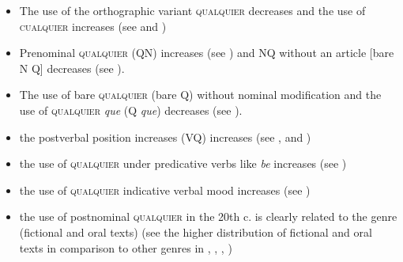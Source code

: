 \begin{itemize}

\item The use of the orthographic variant \textsc{qualquier} decreases and the use of \textsc{cualquier} increases (see  and )
\item Prenominal \textsc{qualquier} (QN) increases (see ) and NQ without an article [bare N Q] decreases (see ).
\item The use of bare \textsc{qualquier} (bare Q) without nominal modification and the use of \textsc{qualquier} \textit{que} (Q \textit{que}) decreases (see ).
\item the postverbal position increases (VQ) increases (see ,  and )
\item the use of \textsc{qualquier} under predicative verbs like \textit{be} increases (see )
\item the use of \textsc{qualquier} indicative verbal mood increases (see )
\item the use of postnominal \textsc{qualquier} in the 20th c. is clearly related to the genre (fictional and oral texts) (see the higher distribution of fictional and oral texts in comparison to other genres in , , , )

\end{itemize}



